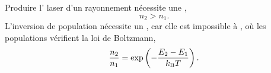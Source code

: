 \documentclass[12pt,fancy]{cours}
\begin{document}

\begin{prop}\label{prop:}
  Produire l' laser d'un rayonnement nécessite une ,%
  \begin{equation*}
    n_2>n_1.
  \end{equation*}
L'inversion de population nécessite un , car elle est impossible à , où les populations vérifient la loi de Boltzmann, 
$$\frac{n_2}{n_1}=\exp\left(-\frac{E_2-E_1}{k_{\rm{B}}T}\right).$$  
\end{prop}
\end{document}
